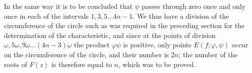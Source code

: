 In the same way it is to be concluded that $\psi$ passes through zero
once and only once in each of the intervals
$1, 3, 5 \dots 4n - 1$.
We thus have a division of the circumference of the circle such as was
required in the preceding section for the determination of the characteristic,
and since at the points of division $\omega, 5\omega, 9\omega \dots (4n - 3)\omega$
the product $\varphi\psi$ is positive, only points $E(f; \varphi, \psi)$
occur on the circumference of the circle, and their number is $2n$; the number
of the roots of $F(z)$ is therefore equal to $n$, which was to be proved.
